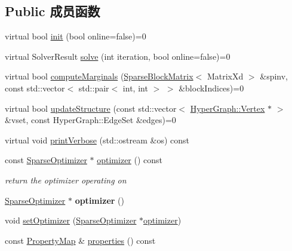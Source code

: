 \subsection*{Public 成员函数}
\begin{DoxyCompactItemize}
\item 
virtual bool \hyperlink{classg2o_1_1OptimizationAlgorithm_af5b54ea6d40a8ab4c16d448ba02a0c80}{init} (bool online=false)=0
\item 
virtual Solver\-Result \hyperlink{classg2o_1_1OptimizationAlgorithm_ab174deeeb2551ceaf715ea09f0f9c077}{solve} (int iteration, bool online=false)=0
\item 
virtual bool \hyperlink{classg2o_1_1OptimizationAlgorithm_a67b159f3a83471ba9ebcc0a9162a0e23}{compute\-Marginals} (\hyperlink{classg2o_1_1SparseBlockMatrix}{Sparse\-Block\-Matrix}$<$ Matrix\-Xd $>$ \&spinv, const std\-::vector$<$ std\-::pair$<$ int, int $>$ $>$ \&block\-Indices)=0
\item 
virtual bool \hyperlink{classg2o_1_1OptimizationAlgorithm_a6b86c5d3c56a41c18f2aee611b62d71b}{update\-Structure} (const std\-::vector$<$ \hyperlink{classg2o_1_1HyperGraph_1_1Vertex}{Hyper\-Graph\-::\-Vertex} $\ast$ $>$ \&vset, const Hyper\-Graph\-::\-Edge\-Set \&edges)=0
\item 
virtual void \hyperlink{classg2o_1_1OptimizationAlgorithm_a61fe205d498ed3b0ac1f812a78c4b0f0}{print\-Verbose} (std\-::ostream \&os) const 
\item 
\hypertarget{classg2o_1_1OptimizationAlgorithm_ae1799d6aed633e94574072d26ed4cb4e}{const \hyperlink{classg2o_1_1SparseOptimizer}{Sparse\-Optimizer} $\ast$ \hyperlink{classg2o_1_1OptimizationAlgorithm_ae1799d6aed633e94574072d26ed4cb4e}{optimizer} () const }\label{classg2o_1_1OptimizationAlgorithm_ae1799d6aed633e94574072d26ed4cb4e}

\begin{DoxyCompactList}\small\item\em return the optimizer operating on \end{DoxyCompactList}\item 
\hypertarget{classg2o_1_1OptimizationAlgorithm_ac6ca7a2adbd25615be78316bc811a315}{\hyperlink{classg2o_1_1SparseOptimizer}{Sparse\-Optimizer} $\ast$ {\bfseries optimizer} ()}\label{classg2o_1_1OptimizationAlgorithm_ac6ca7a2adbd25615be78316bc811a315}

\item 
void \hyperlink{classg2o_1_1OptimizationAlgorithm_aff88a3dc8357c98712ff0047e601bd5e}{set\-Optimizer} (\hyperlink{classg2o_1_1SparseOptimizer}{Sparse\-Optimizer} $\ast$\hyperlink{classg2o_1_1OptimizationAlgorithm_ae1799d6aed633e94574072d26ed4cb4e}{optimizer})
\item 
\hypertarget{classg2o_1_1OptimizationAlgorithm_a1e03513e64271df6420ca71bc7524e67}{const \hyperlink{classg2o_1_1PropertyMap}{Property\-Map} \& \hyperlink{classg2o_1_1OptimizationAlgorithm_a1e03513e64271df6420ca71bc7524e67}{properties} () const }\label{classg2o_1_1OptimizationAlgorithm_a1e03513e64271df6420ca71bc7524e67}


\end{DoxyCompactItemize}
